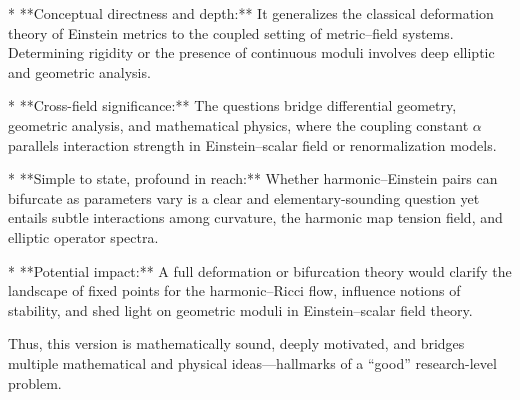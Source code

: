 * **Conceptual directness and depth:** It generalizes the classical deformation theory of Einstein metrics to the coupled setting of metric–field systems. Determining rigidity or the presence of continuous moduli involves deep elliptic and geometric analysis.

* **Cross-field significance:** The questions bridge differential geometry, geometric analysis, and mathematical physics, where the coupling constant \(\alpha\) parallels interaction strength in Einstein–scalar field or renormalization models.

* **Simple to state, profound in reach:** Whether harmonic–Einstein pairs can bifurcate as parameters vary is a clear and elementary-sounding question yet entails subtle interactions among curvature, the harmonic map tension field, and elliptic operator spectra.

* **Potential impact:** A full deformation or bifurcation theory would clarify the landscape of fixed points for the harmonic–Ricci flow, influence notions of stability, and shed light on geometric moduli in Einstein–scalar field theory.

Thus, this version is mathematically sound, deeply motivated, and bridges multiple mathematical and physical ideas—hallmarks of a “good” research-level problem.